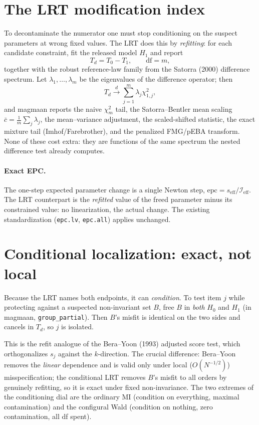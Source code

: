 \documentclass[11pt]{article}
\newcommand{\dto}{\xrightarrow{d}}
\theoremstyle{plain}
\theoremstyle{remark}
\begin{document}
\section{The LRT modification index}

To decontaminate the numerator one must stop conditioning on the suspect
parameters at wrong fixed values. The LRT does this by \emph{refitting}: for each
candidate constraint, fit the released model $H_1$ and report
\[
  T_d = T_0 - T_1, \qquad \mathrm{df} = m,
\]
together with the robust reference-law family from the Satorra (2000) difference
spectrum. Let $\lambda_1,\dots,\lambda_m$ be the eigenvalues of the difference
operator; then
\[
  T_d \dto \sum_{j=1}^m \lambda_j \chi^2_{1,j},
\]
and magmaan reports the naive $\chi^2_m$ tail, the Satorra--Bentler mean scaling
$\bar c = \tfrac1m\sum_j\lambda_j$, the mean--variance adjustment, the
scaled-shifted statistic, the exact mixture tail (Imhof/Farebrother), and the
penalized FMG/pEBA transform. None of these cost extra: they are functions of the
same spectrum the nested difference test already computes.

\paragraph{Exact EPC.} The one-step expected parameter change is a single Newton
step, $\mathrm{epc} = s_{\mathrm{eff}}/\mathcal{I}_{\mathrm{eff}}$. The LRT
counterpart is the \emph{refitted} value of the freed parameter minus its
constrained value: no linearization, the actual change. The existing
standardization (\texttt{epc.lv}, \texttt{epc.all}) applies unchanged.

\section{Conditional localization: exact, not local}

Because the LRT names both endpoints, it can \emph{condition}. To test item $j$
while protecting against a suspected non-invariant set $B$, free $B$ in
\emph{both} $H_0$ and $H_1$ (in magmaan, \texttt{group\_partial}). Then $B$'s
misfit is identical on the two sides and cancels in $T_d$, so $j$ is isolated.

This is the refit analogue of the Bera--Yoon (1993) adjusted score test, which
orthogonalizes $s_j$ against the $k$-direction. The crucial difference: Bera--Yoon
removes the \emph{linear} dependence and is valid only under local
($O(N^{-1/2})$) misspecification; the conditional LRT removes $B$'s misfit to all
orders by genuinely refitting, so it is exact under fixed non-invariance. The two
extremes of the conditioning dial are the ordinary MI (condition on everything,
maximal contamination) and the configural Wald (condition on nothing, zero
contamination, all df spent).
\end{document}
